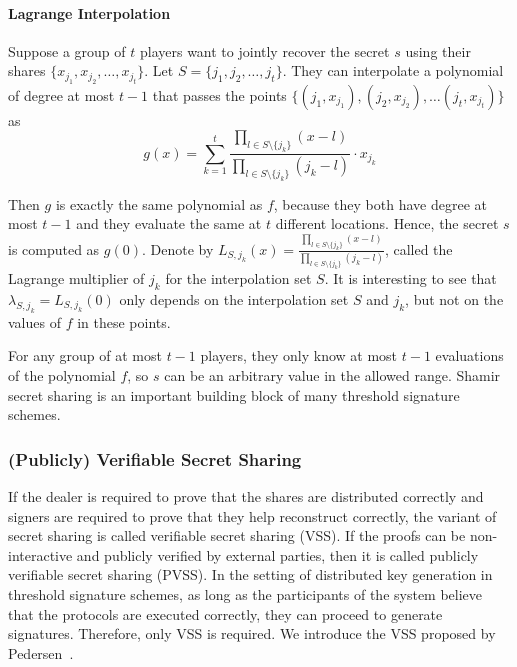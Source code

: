 \paragraph{Lagrange Interpolation} Suppose a group of $t$ players want to jointly recover the secret $s$ using their shares $\{x_{j_1}, x_{j_2},\dots, x_{j_t}\}$. Let $S = \{j_1, j_2, \dots, j_t\}$. They can interpolate a polynomial of degree at most $t-1$ that passes the points $\{(j_1, x_{j_1}), (j_2, x_{j_2}), \dots (j_t, x_{j_t})\}$ as
\begin{equation*} 
    g(x) = \sum_{k=1}^{t}\frac{\prod_{l \in S\setminus \{j_k\} } (x - l)}{\prod_{l \in S\setminus \{j_k\} } (j_k - l)}\cdot x_{j_k}   
\end{equation*}

\par Then $g$ is exactly the same polynomial as $f$, because they both have degree at most $t-1$ and they evaluate the same at $t$ different locations. Hence, the secret $s$ is computed as $g(0)$. Denote by $L_{S, j_k}(x) = \frac{\prod_{l \in S\setminus \{j_k\} } (x - l)}{\prod_{l \in S\setminus \{j_k\} } (j_k - l)}$, called the Lagrange multiplier of $j_k$ for the interpolation set $S$. It is interesting to see that $\lambda_{S, j_k} = L_{S, j_k}(0)$ only depends on the interpolation set $S$ and $j_k$, but not on the values of $f$ in these points.  

For any group of at most $t-1$ players, they only know at most $t-1$ evaluations of the polynomial $f$, so $s$ can be an arbitrary value in the allowed range. Shamir secret sharing is an important building block of many threshold signature schemes. 

\subsubsection{(Publicly) Verifiable Secret Sharing} 
If the dealer is required to prove that the shares are distributed correctly and signers are required to prove that they help reconstruct correctly, the variant of secret sharing is called verifiable secret sharing (VSS). If the proofs can be non-interactive and publicly verified by external parties, then it is called publicly verifiable secret sharing (PVSS). In the setting of distributed key generation in threshold signature schemes, as long as the participants of the system believe that the protocols are executed correctly, they can proceed to generate signatures. Therefore, only VSS is required. We introduce the VSS proposed by Pedersen~\cite{DBLP:conf/crypto/Pedersen91}. 

